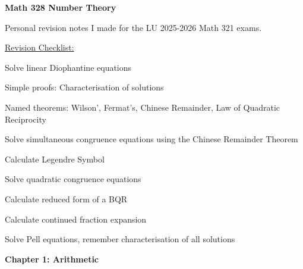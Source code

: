 \documentclass[a4paper, 12pt]
{article}
\begin{document}
	\textbf{Math 328 Number Theory}
	
	Personal revision notes I made for the LU 2025-2026 Math 321 exams.
	
	\hfill
	
	\underline{Revision Checklist:}
	\begin{checklist}
		\item Solve linear Diophantine equations
		\item Simple proofs:  Characterisation of solutions
		\item Named theorems: Wilson', Fermat's, Chinese Remainder, Law of Quadratic Reciprocity
		\item Solve simultaneous congruence equations using the Chinese Remainder Theorem
		\item Calculate Legendre Symbol
		\item Solve quadratic congruence equations 
		\item Calculate reduced form of  a BQR
		\item Calculate continued fraction expansion
		\item Solve Pell equations, remember characterisation of all solutions
	
	\end{checklist}
	
	\hfill
	
	\textbf{Chapter 1: Arithmetic}
	
\end{document}
